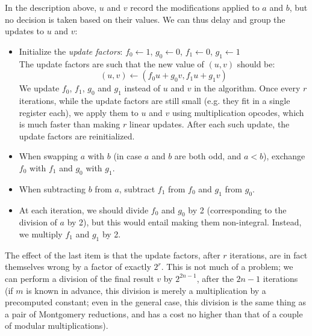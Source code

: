 \documentclass{llncs}
\begin{document}
In the description above, $u$ and $v$ record the modifications applied
to $a$ and $b$, but no decision is taken based on their values. We can
thus delay and group the updates to $u$ and $v$:
\begin{itemize}

    \item Initialize the \emph{update factors}:
    $f_0 \leftarrow 1$, $g_0 \leftarrow 0$,
    $f_1 \leftarrow 0$, $g_1 \leftarrow 1$ \\
    The update factors are such that the new value of $(u, v)$ should be:
    \begin{equation*}
        (u, v) \leftarrow (f_0 u + g_0 v, f_1 u + g_1 v)
    \end{equation*}
    We update $f_0$, $f_1$, $g_0$ and $g_1$ instead of $u$ and $v$ in
    the algorithm. Once every $r$ iterations, while the update factors
    are still small (e.g. they fit in a single register each), we apply
    them to $u$ and $v$ using multiplication opcodes, which is much
    faster than making $r$ linear updates. After each such update, the
    update factors are reinitialized.

    \item When swapping $a$ with $b$ (in case $a$ and $b$ are both odd,
    and $a < b$), exchange $f_0$ with $f_1$ and $g_0$ with $g_1$.

    \item When subtracting $b$ from $a$, subtract $f_1$ from $f_0$ and
    $g_1$ from $g_0$.

    \item At each iteration, we should divide $f_0$ and $g_0$ by 2
    (corresponding to the division of $a$ by 2), but this would entail
    making them non-integral. Instead, we multiply $f_1$ and $g_1$ by 2.

\end{itemize}

The effect of the last item is that the update factors, after $r$
iterations, are in fact themselves wrong by a factor of exactly $2^r$.
This is not much of a problem; we can perform a division of the final
result $v$ by $2^{2n-1}$, after the $2n-1$ iterations (if $m$ is known
in advance, this division is merely a multiplication by a precomputed
constant; even in the general case, this division is the same thing as a
pair of Montgomery reductions, and has a cost no higher than that of a
couple of modular multiplications).
\end{document}
